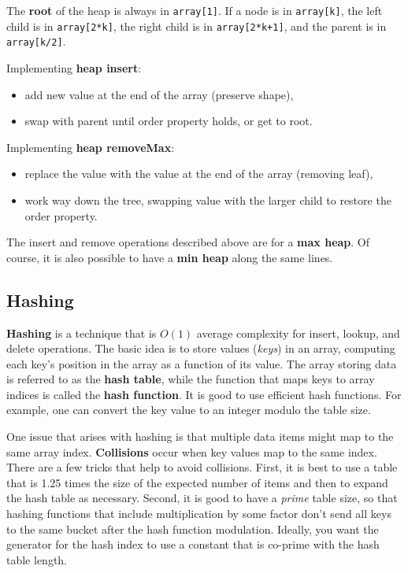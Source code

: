 The \textbf{root} of the heap is always in \texttt{array[1]}. If a node is in \texttt{array[k]}, the left child is in \texttt{array[2*k]}, the right child is in \texttt{array[2*k+1]}, and the parent is in \texttt{array[k/2]}.

Implementing \textbf{heap insert}:
\begin{itemize}
	\item add new value at the end of the array (preserve shape),
	\item swap with parent until order property holds, or get to root.
\end{itemize}

Implementing \textbf{heap removeMax}:
\begin{itemize}
	\item replace the value with the value at the end of the array (removing leaf), 
	\item work way down the tree, swapping value with the larger child to restore the order property.
\end{itemize}

The insert and remove operations described above are for a \textbf{max heap}. Of course, it is also possible to have a \textbf{min heap} along the same lines. 

\subsection{Hashing}

\textbf{Hashing} is a technique that is $O(1)$ average complexity for insert, lookup, and delete operations. The basic idea is to store values (\textit{keys}) in an array, computing each key's position in the array as a function of its value. The array storing data is referred to as the \textbf{hash table}, while the function that maps keys to array indices is called the \textbf{hash function}. It is good to use efficient hash functions. For example, one can convert the key value to an integer modulo the table size. 

One issue that arises with hashing is that multiple data items might map to the same array index. \textbf{Collisions} occur when key values map to the same index. There are a few tricks that help to avoid collisions. First, it is best to use a table that is 1.25 times the size of the expected number of items and then to expand the hash table as necessary. Second, it is good to have a \textit{prime} table size, so that hashing functions that include multiplication by some factor don't send all keys to the same bucket after the hash function modulation. Ideally, you want the generator for the hash index to use a constant that is co-prime with the hash table length. 

